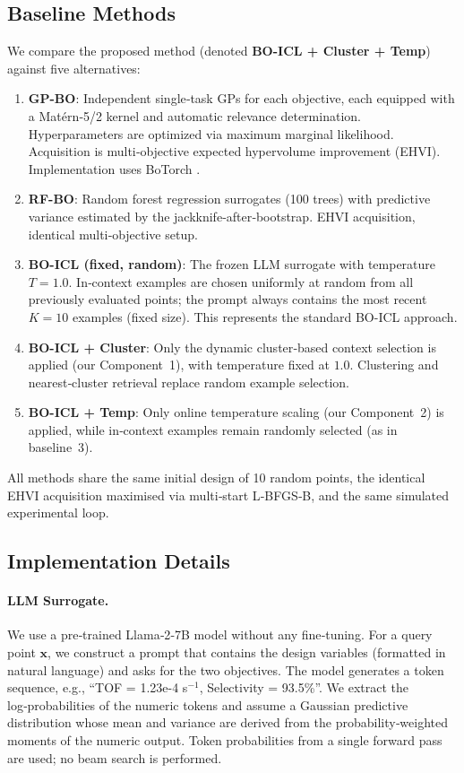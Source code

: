 \documentclass{article}
\begin{document}
\subsection{Baseline Methods}
We compare the proposed method (denoted \textbf{BO-ICL + Cluster + Temp}) against five alternatives:
\begin{enumerate}
    \item \textbf{GP-BO}: Independent single‑task GPs for each objective, each equipped with a Matérn‑5/2 kernel and automatic relevance determination. Hyperparameters are optimized via maximum marginal likelihood. Acquisition is multi‑objective expected hypervolume improvement (EHVI). Implementation uses BoTorch \cite{balandat2020botorch}.
    \item \textbf{RF-BO}: Random forest regression surrogates (100 trees) with predictive variance estimated by the jackknife‑after‑bootstrap. EHVI acquisition, identical multi‑objective setup.
    \item \textbf{BO-ICL (fixed, random)}: The frozen LLM surrogate with temperature $T=1.0$. In‑context examples are chosen uniformly at random from all previously evaluated points; the prompt always contains the most recent $K=10$ examples (fixed size). This represents the standard BO-ICL approach.
    \item \textbf{BO-ICL + Cluster}: Only the dynamic cluster‑based context selection is applied (our Component~1), with temperature fixed at $1.0$. Clustering and nearest‑cluster retrieval replace random example selection.
    \item \textbf{BO-ICL + Temp}: Only online temperature scaling (our Component~2) is applied, while in‑context examples remain randomly selected (as in baseline~3).
\end{enumerate}
All methods share the same initial design of 10 random points, the identical EHVI acquisition maximised via multi‑start L‑BFGS‑B, and the same simulated experimental loop.

\subsection{Implementation Details}
\paragraph{LLM Surrogate.}
We use a pre‑trained Llama‑2‑7B \cite{touvron2023llama2} model without any fine‑tuning. For a query point $\mathbf{x}$, we construct a prompt that contains the design variables (formatted in natural language) and asks for the two objectives. The model generates a token sequence, e.g., ``TOF = 1.23e-4 s$^{-1}$, Selectivity = 93.5\%''. We extract the log‑probabilities of the numeric tokens and assume a Gaussian predictive distribution whose mean and variance are derived from the probability‑weighted moments of the numeric output. Token probabilities from a single forward pass are used; no beam search is performed.
\end{document}
